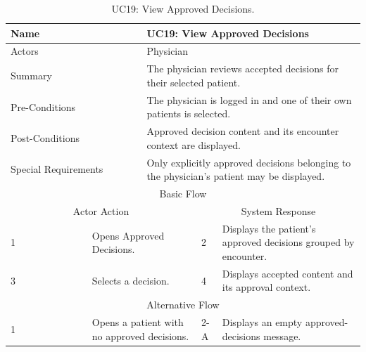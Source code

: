 \begin{table}[htbp]
\centering
\small
\caption{UC19: View Approved Decisions.}
\label{tab:kashaf:uc19}
\begin{tabular}{|p{}|p{}|p{}|p{}|p{}|}
\hline
\multicolumn{2}{|p{\dimexpr0.225\textwidth+2\tabcolsep+\arrayrulewidth\relax}|}{Name} & \multicolumn{3}{p{\dimexpr0.575\textwidth+4\tabcolsep+2\arrayrulewidth\relax}|}{UC19: View Approved Decisions} \\ \hline
\multicolumn{2}{|p{\dimexpr0.225\textwidth+2\tabcolsep+\arrayrulewidth\relax}|}{Actors} & \multicolumn{3}{p{\dimexpr0.575\textwidth+4\tabcolsep+2\arrayrulewidth\relax}|}{Physician} \\ \hline
\multicolumn{2}{|p{\dimexpr0.225\textwidth+2\tabcolsep+\arrayrulewidth\relax}|}{Summary} & \multicolumn{3}{p{\dimexpr0.575\textwidth+4\tabcolsep+2\arrayrulewidth\relax}|}{The physician reviews accepted decisions for their selected patient.} \\ \hline
\multicolumn{2}{|p{\dimexpr0.225\textwidth+2\tabcolsep+\arrayrulewidth\relax}|}{Pre-Conditions} & \multicolumn{3}{p{\dimexpr0.575\textwidth+4\tabcolsep+2\arrayrulewidth\relax}|}{The physician is logged in and one of their own patients is selected.} \\ \hline
\multicolumn{2}{|p{\dimexpr0.225\textwidth+2\tabcolsep+\arrayrulewidth\relax}|}{Post-Conditions} & \multicolumn{3}{p{\dimexpr0.575\textwidth+4\tabcolsep+2\arrayrulewidth\relax}|}{Approved decision content and its encounter context are displayed.} \\ \hline
\multicolumn{2}{|p{\dimexpr0.225\textwidth+2\tabcolsep+\arrayrulewidth\relax}|}{Special Requirements} & \multicolumn{3}{p{\dimexpr0.575\textwidth+4\tabcolsep+2\arrayrulewidth\relax}|}{Only explicitly approved decisions belonging to the physician's patient may be displayed.} \\ \hline
\multicolumn{5}{|c|}{Basic Flow} \\ \hline
\multicolumn{3}{|c|}{Actor Action} & \multicolumn{2}{c|}{System Response} \\ \hline
1 & \multicolumn{2}{p{\dimexpr0.37\textwidth+2\tabcolsep+\arrayrulewidth\relax}|}{Opens Approved Decisions.} & 2 & Displays the patient's approved decisions grouped by encounter. \\ \hline
3 & \multicolumn{2}{p{\dimexpr0.37\textwidth+2\tabcolsep+\arrayrulewidth\relax}|}{Selects a decision.} & 4 & Displays accepted content and its approval context. \\ \hline
\multicolumn{5}{|c|}{Alternative Flow} \\ \hline
1 & \multicolumn{2}{p{\dimexpr0.37\textwidth+2\tabcolsep+\arrayrulewidth\relax}|}{Opens a patient with no approved decisions.} & 2-A & Displays an empty approved-decisions message. \\ \hline
\end{tabular}
\end{table}

